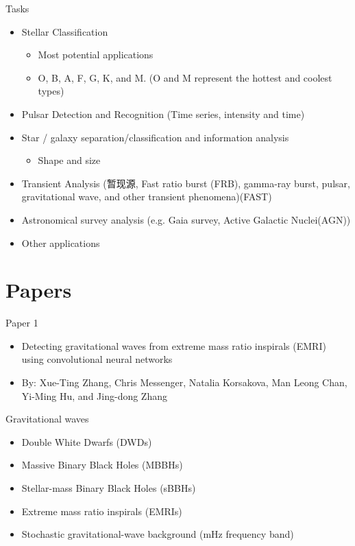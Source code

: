 \documentclass[aspectratio=1610,xcolor={dvipsnames},hyperref={colorlinks,unicode,linkcolor=violet,anchorcolor=blueviolet,citecolor=YellowOrange,filecolor=black,urlcolor=Aquamarine}]{beamer}
\begin{document}
\begin{frame}[label={sec:orgd165f2f}]{Tasks}
\begin{itemize}
\item Stellar Classification \autocite{jing-minNewStellarSpectral2020,chiuSearchingYoungStellar2021}
\begin{itemize}
\item Most potential applications
\item O, B, A, F, G, K, and M.  (O and M represent the hottest and coolest types)
\end{itemize}
\item Pulsar Detection and Recognition (Time series, intensity and time)
\item Star / galaxy separation/classification and information analysis \autocite{hausenMorpheusDeepLearning2020}
\begin{itemize}
\item Shape and size
\end{itemize}
\item Transient Analysis (暂现源, Fast ratio burst (FRB), gamma-ray burst,
pulsar, gravitational
wave\autocite{zhangDetectingGravitationalWaves2022}, and other
transient phenomena)(FAST)
\item Astronomical survey analysis (e.g. Gaia survey, Active Galactic Nuclei(AGN))
\item Other applications
\end{itemize}
\end{frame}

\section{Papers}
\label{sec:org8c0fb40}

\begin{frame}[label={sec:org169747f}]{Paper 1}
\begin{itemize}
\item Detecting gravitational waves from extreme mass ratio inspirals (EMRI)
using convolutional neural networks
\autocite{zhangDetectingGravitationalWaves2022}
\item By: Xue-Ting Zhang, Chris Messenger, Natalia Korsakova, Man Leong
Chan, Yi-Ming Hu, and Jing-dong Zhang
\end{itemize}
\end{frame}

\begin{frame}[label={sec:org8e76c44}]{Gravitational waves}
\begin{itemize}
\item Double White Dwarfs (DWDs)
\item Massive Binary Black Holes (MBBHs)
\item Stellar-mass Binary Black Holes (sBBHs)
\item Extreme mass ratio inspirals (EMRIs)
\item Stochastic gravitational-wave background (mHz frequency band)
\end{itemize}
\end{frame}
\end{document}
